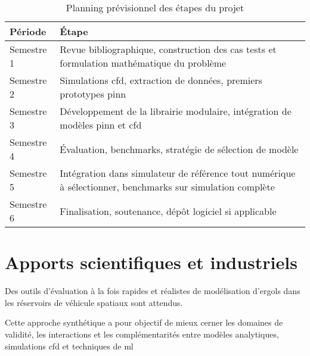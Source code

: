 \documentclass[12pt]{article}
\begin{document}
	\begin{table}[h]
		\centering
		\begin{tabularx}{\textwidth}{l X}
			
			\hline
			
			Période & Étape \\
			
			\hline
			
			Semestre 1 & Revue bibliographique, construction des cas tests et formulation mathématique du problème \\
			Semestre 2 & Simulations \acrshort{cfd}, extraction de données, premiers prototypes \acrshort{pinn} \\
			Semestre 3 & Développement de la librairie modulaire, intégration de modèles \acrshort{pinn} et \acrshort{cfd} \\
			Semestre 4 & Évaluation, benchmarks, stratégie de sélection de modèle \\
			Semestre 5 & Intégration dans simulateur de référence tout numérique à sélectionner, benchmarks sur simulation complète \\
			Semestre 6 & Finalisation, soutenance, dépôt logiciel si applicable \\
			
			\hline
			
		\end{tabularx}
		\caption{Planning prévisionnel des étapes du projet}
	\end{table}	
	
	\section*{Apports scientifiques et industriels}
	
	Des outils d'évaluation à la fois rapides et réalistes de modélisation d'ergols dans les réservoirs de véhicule spatiaux sont attendus.
	
	Cette approche synthétique a pour objectif de mieux cerner les domaines de validité, les interactions et les complémentarités entre modèles analytiques, simulations \acrshort{cfd} et techniques de \acrlong{ml}
	
\end{document}
